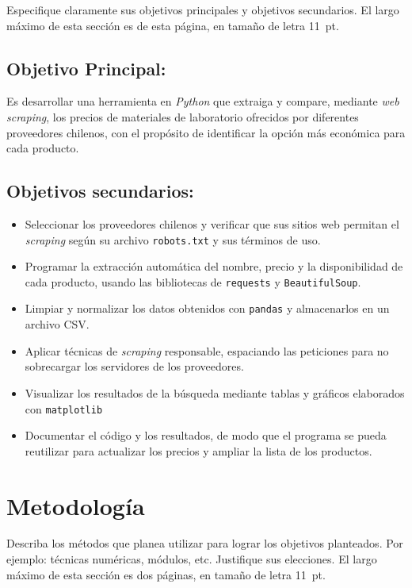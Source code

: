 \documentclass[11pt,spanish]{article}
\begin{document}
\begin{framed}
  \noindent Especifique claramente sus objetivos principales y
  objetivos secundarios. El largo máximo de esta sección es de esta
  página, en tamaño de letra 11~pt.
\end{framed}
\subsection*{Objetivo Principal:} Es desarrollar una herramienta en \textit{Python} que extraiga y compare, mediante \textit{ web scraping}, los precios de materiales de laboratorio ofrecidos por diferentes proveedores chilenos, con el propósito de identificar la opción más económica para cada producto.
\subsection*{Objetivos secundarios:} 
\begin{itemize}
\item Seleccionar los proveedores chilenos y verificar que sus sitios web permitan el \textit{scraping} según su archivo \texttt{robots.txt} y sus términos de uso.
\item Programar la extracción automática del nombre, precio y la disponibilidad de cada producto, usando las bibliotecas de \texttt{requests} y \texttt{BeautifulSoup}.
\item Limpiar y normalizar los datos obtenidos con \texttt{pandas} y almacenarlos en un archivo CSV. 
\item Aplicar técnicas de \textit{scraping} responsable, espaciando las peticiones para no sobrecargar los servidores de los proveedores.
\item Visualizar los resultados de la búsqueda mediante tablas y gráficos elaborados con \texttt{matplotlib}
\item Documentar el código y los resultados, de modo que el programa se pueda reutilizar para actualizar los precios y ampliar la lista de los productos.
\end{itemize} 
\newpage

\section{Metodología}

\begin{framed}
  \noindent Describa los métodos que planea utilizar para lograr los
  objetivos planteados. Por ejemplo: técnicas numéricas, módulos, etc.
  Justifique sus elecciones. El largo máximo de esta sección es dos páginas, en
  tamaño de letra 11~pt.
\end{framed}
\newpage
\end{document}
